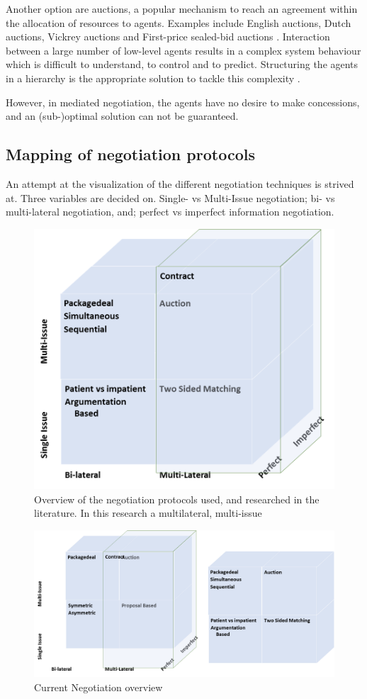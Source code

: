 Another option are auctions, a popular mechanism to reach an agreement within the allocation of resources to agents. Examples include English auctions, Dutch auctions, Vickrey auctions and First-price sealed-bid auctions \citep{wooldridge2009introduction}. Interaction between a large number of low-level agents results in a complex system behaviour which is difficult to understand, to control and to predict. Structuring the agents in a hierarchy is the appropriate solution to tackle this complexity \citep{van1998reference}.

However, in mediated negotiation, the agents have no desire to make concessions, and an (sub-)optimal solution can not be guaranteed.

\subsection{Mapping of negotiation protocols}
An attempt at the visualization of the different negotiation techniques is strived at. Three variables are decided on. Single- vs Multi-Issue negotiation; bi- vs multi-lateral negotiation, and; perfect vs imperfect information negotiation.  
\begin{figure}[h]
	\centering
	\includegraphics[width=0.7\linewidth]{img/mapping_nego}
	\caption{Overview of the negotiation protocols used, and researched in the literature. In this research a multilateral, multi-issue }
	\label{fig:mapping_nego}
\end{figure}


\begin{figure}[h]
	\centering
	\includegraphics[width=0.9\linewidth]{img/mapping_nego2}
	\caption{Current Negotiation overview}
	\label{fig:mapping_nego2}
\end{figure}


